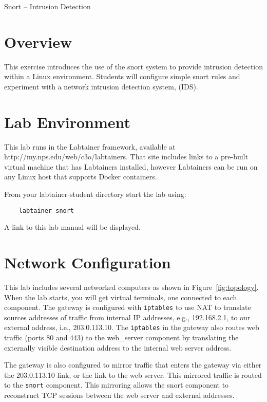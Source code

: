 


\begin{center}
{\LARGE Snort -- Intrusion Detection}
\vspace{0.1in}\\
\end{center}

\copyrightnotice

\section{Overview}
This exercise introduces the use of the snort system
to provide intrusion detection within a
Linux environment.  Students will configure simple 
snort rules and experiment with a network 
intrusion detection system, (IDS).  


\section{Lab Environment}
This lab runs in the Labtainer framework,
available at http://my.nps.edu/web/c3o/labtainers.
That site includes links to a pre-built virtual machine
that has Labtainers installed, however Labtainers can
be run on any Linux host that supports Docker containers.

From your labtainer-student directory start the lab using:
\begin{verbatim}
    labtainer snort
\end{verbatim}
\noindent A link to this lab manual will be displayed.  

\section{Network Configuration}
This lab includes several networked computers as shown in Figure~\ref{fig:topology}.
When the lab starts, you will get virtual terminals, one connected to each
component.  The gateway is configured with {\tt iptables} to use NAT to translate
sources addresses of traffic from internal IP addresses, e.g., 192.168.2.1, to
our external address, i.e., 203.0.113.10.  The {\tt iptables} in the gateway also
routes web traffic (ports 80 and 443) to the web\_server component by translating
the externally visible destination address to the internal web server address.

The gateway is also configured to mirror traffic that enters the gateway 
via either the 203.0.113.10 link, or the link to the web server.  This
mirrored traffic is routed to the {\tt snort} component.  This mirroring allows
the snort component to reconstruct TCP sessions between the web server and external
addresses.

